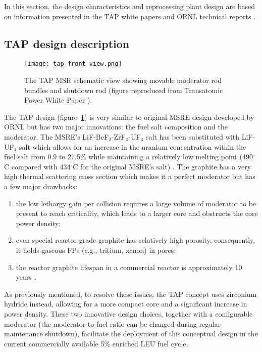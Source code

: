 In this section, the design characteristics and reprocessing plant design are 
based on
information presented in the TAP white papers  
\cite{transatomic_power_corporation_technical_2016, 
transatomic_power_corporation_neutronics_2016} and \gls{ORNL} technical 
reports \cite{betzler_two-dimensional_2017, betzler_assessment_2017}.

\subsection{TAP design description}
\begin{figure}[h] %
	  		\hspace{+2.2in}
	\texttt{[image: tap\_front\_view.png]}
	\caption{The \gls{TAP} \gls{MSR} schematic view showing movable moderator 
		rod 
		bundles and shutdown rod (figure reproduced from Transatomic Power 
		White Paper 
		\cite{transatomic_power_corporation_technical_2016}).}
	\label{fig:tap-main-view}
\end{figure}
The \gls{TAP} design (figure~\ref{fig:tap-main-view}) is very similar to 
original \gls{MSRE} design developed by \gls{ORNL} 
\cite{haubenreich_experience_1970} but has two major innovations: 
the fuel salt composition and the moderator. The \gls{MSRE}'s 
LiF-BeF$_2$-ZrF$_4$-UF$_4$ salt has been substituted with LiF-UF$_4$ salt 
which allows for an increase in the uranium concentration within the fuel salt 
from 0.9 to 27.5\% while maintaining a relatively low melting point 
(490$^{\circ}$C compared with 434$^{\circ}$C for the original \gls{MSRE}'s 
salt) \cite{betzler_two-dimensional_2017}. The graphite has a very high 
thermal scattering cross section which makes it a perfect moderator but has 
a few major drawbacks: 
\begin{enumerate}[label=(\alph*)]
	\item the low lethargy gain per collision requires a large volume of 
	moderator to be present to reach criticality, which leads to a larger core 
	and obstructs the core power density;
	\item even special reactor-grade graphite has relatively high porosity, 
	consequently, it holds gaseous \glspl{FP} (e.g., tritium, xenon) in pores;
	\item the reactor graphite lifespan in a commercial reactor is 
	approximately 10 years \cite{robertson_conceptual_1971}.
\end{enumerate}
As previously mentioned, to resolve these issues, the \gls{TAP} concept uses 
zirconium hydride instead, allowing for a more compact core and a significant 
increase in power density. These two innovative design choices, together with 
a configurable moderator (the moderator-to-fuel ratio can be changed during 
regular maintenance shutdown), facilitate the deployment of this conceptual 
design in the current commercially available 5\% enriched \gls{LEU} fuel cycle. 

